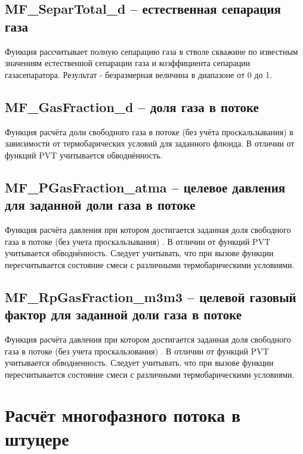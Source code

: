 \documentclass[]{scrreprt}
\begin{document}

\subsection{MF\_SeparTotal\_d – естественная сепарация газа}

Функция рассчитывает полную сепарацию газа в стволе скважине по известным значениям естественной сепарации газа и коэффициента сепарации газасепаратора. Результат - безразмерная величина в диапазоне от 0 до 1. 


\subsection{MF\_GasFraction\_d – доля газа в потоке}
Функция расчёта доли свободного газа в потоке (без учёта проскальзывания) в зависимости от термобарических условий для заданного флюида. 
В отличии от функций PVT учитывается обводнённость.

\subsection{MF\_PGasFraction\_atma – целевое давления для заданной доли газа в потоке}
Функция расчёта давления при котором достигается заданная доля свободного газа в потоке (без учета проскальзывания) . 
В отличии от функций PVT учитывается обводнённость.
Следует учитывать, что при вызове функции пересчитывается состояние смеси с различными термобарическими условиями.

\subsection{MF\_RpGasFraction\_m3m3 – целевой газовый фактор для заданной доли газа в потоке}
Функция расчёта давления при котором достигается заданная доля свободного газа в потоке (без учета проскальзования) . 
В отличии от функций PVT учитывается обводненность.
Следует учитывать, что при вызове функции пересчитывается состояние смеси с различными термобарическими условиями.

\section{Расчёт многофазного потока в штуцере}
\end{document}
